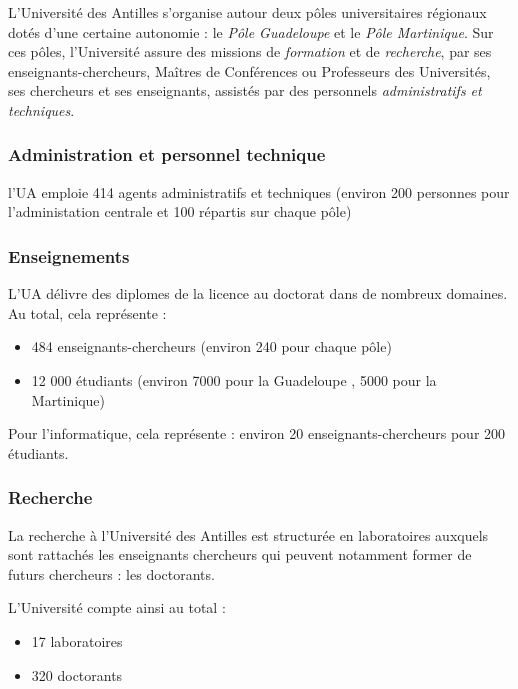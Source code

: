 L'Université des Antilles s'organise autour deux pôles universitaires
régionaux dotés d'une certaine autonomie : le \textit{Pôle Guadeloupe} et le \textit{Pôle Martinique}.
Sur ces pôles, l'Université assure des missions de \emph{formation} et
de \emph{recherche}, par ses enseignants-chercheurs, Maîtres de Conférences ou Professeurs des Universités, ses chercheurs et ses enseignants, assistés par des personnels \emph{administratifs et
techniques}.

\hypertarget{administration-et-personnel-technique}{%
\subsubsection{Administration et personnel
technique}
\label{administration-et-personnel-technique}}

l'UA emploie 414 agents administratifs et techniques (environ 200 personnes
pour l'administation centrale et 100 répartis sur chaque pôle)

\hypertarget{enseignements}{%
\subsubsection{Enseignements}\label{enseignements}}

L'UA délivre des diplomes de la licence au doctorat dans de nombreux
domaines. Au total, cela représente :

\begin{itemize}
\tightlist
\item
  484 enseignants-chercheurs (environ 240 pour chaque pôle)
\item
  12 000 étudiants (environ 7000 pour la Guadeloupe , 5000 pour la
  Martinique)
\end{itemize}

Pour l'informatique, cela représente : environ 20
enseignants-chercheurs pour 200 étudiants.

\hypertarget{recherche}{%
\subsubsection{Recherche}\label{recherche}}

La recherche à l'Université des Antilles est structurée en laboratoires auxquels sont rattachés les
enseignants chercheurs qui peuvent notamment former de futurs chercheurs : les
doctorants.

L'Université compte ainsi au total :

\begin{itemize}
\tightlist
\item
  17 laboratoires
\item
  320 doctorants
\end{itemize}

